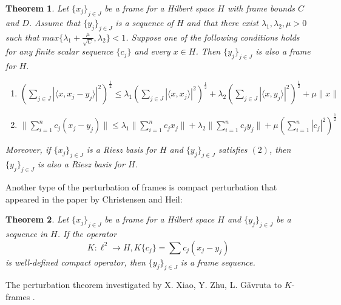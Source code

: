 \documentclass[11pt]{amsart}
\newtheorem{thm}{Theorem}[section]
\theoremstyle{definition}
\theoremstyle{remark}
\numberwithin{equation}{section}
\begin{document}
\begin{thm}\cite{ole1}
 Let $\{x_j\}_{j\in J}$ be a frame for a Hilbert space $ H$ with frame bounds $C$ and $D$. Assume that
$\{y_j\}_{j\in J}$ is a sequence of $H$ and that there exist $\lambda_1,\lambda_2,\mu>0$ such that $max\{\lambda_1+\frac{\mu}{\sqrt{C}},\lambda_2\}<1$.
 Suppose one of the following conditions holds for any finite scalar sequence $\{c_j\}$ and every $x\in H$. Then $\{y_j\}_{j\in J}$ is
also a frame for $H$.
\begin{enumerate}
\item $(\sum_{j\in J} |\langle x,x_j-y_j\rangle|^2)^\frac{1}{2} \leq\lambda_1 (\sum_{j\in J} |\langle x,x_j\rangle|^2)^\frac{1}{2} +\lambda_2(\sum_{j\in J} |\langle x,y_j\rangle|^2)^\frac{1}{2}  +\mu\|x\|$                                                \item $ \|\sum_{i=1}^{n}c_j(x_j-y_j)\|\leq \lambda_1\|\sum_{i=1}^{n}c_j x_j\|          +\lambda_2\|\sum_{i=1}^{n}c_j y_j\|+\mu(\sum_{i=1}^{n}|c_j|^2)^{\frac{1}{2}}       $
\end{enumerate}

Moreover, if $\{x_j\}_{j\in J}$ is a Riesz basis for $H$ and $\{y_j\}_{j\in J}$ satisfies $(2)$, then $\{y_j\}_{j\in J}$ is also a Riesz basis for $H$.
\end{thm}
Another type of the perturbation of frames is compact perturbation that appeared in the paper \cite{heil} by Christensen and Heil:
\begin{thm}\cite{heil}
Let $\{x_j\}_{j\in J}$ be a frame for a Hilbert space $ H$ and $\{y_j\}_{j\in J}$ be a sequence in $H$. If the operator $$K:\ell^2\to H, K\{c_j\}=\sum c_j(x_j-y_j)  $$ is well-defined compact operator, then $\{y_j\}_{j\in J}$
is a frame sequence.
\end{thm}

The perturbation theorem investigated by  X. Xiao, Y. Zhu, L. G\v{a}vruta to $K$-frames \cite{12}.
\end{document}
